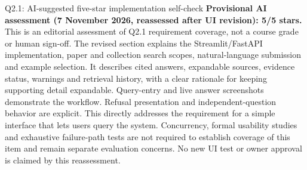\begin{review}{Q2.1: AI-suggested five-star implementation self-check}
\quad\textbf{Provisional AI assessment (7 November 2026, reassessed after UI revision): 5/5 stars.} This is an editorial assessment of Q2.1 requirement coverage, not a course grade or human sign-off. The revised section explains the Streamlit/FastAPI implementation, paper and collection search scopes, natural-language submission and example selection. It describes cited answers, expandable sources, evidence status, warnings and retrieval history, with a clear rationale for keeping supporting detail expandable. Query-entry and live answer screenshots demonstrate the workflow. Refusal presentation and independent-question behavior are explicit. This directly addresses the requirement for a simple interface that lets users query the system. Concurrency, formal usability studies and exhaustive failure-path tests are not required to establish coverage of this item and remain separate evaluation concerns. No new UI test or owner approval is claimed by this reassessment.
\end{review}
